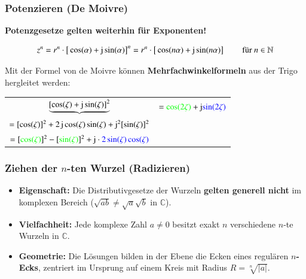 \subsubsection{Potenzieren (De Moivre)}

\textbf{Potenzgesetze gelten weiterhin für  Exponenten!}

\[z^n = r^n \cdot \big[ \cos(\alpha) + \mathop{} \! \mathrm{j} \sin(\alpha) \big]^n = r^n \cdot \big[ \cos(n \alpha) + \mathop{} \! \mathrm{j} \sin(n \alpha) \big] \qquad \text{ für } n \in \mathbb{N} \]

Mit der Formel von de Moivre können \textbf{Mehrfachwinkelformeln} aus der Trigo hergleitet
werden:\vspace{-1em}

\begin{center}
    \begin{tabular}{cl}
        $\underbrace{[\cos(\zeta) + \mathop{} \! \mathrm{j} \sin(\zeta)]^2} $                                                                        & $= {\color{green}\cos(2\zeta)} + \mathop{} \! \mathrm{j} {\color{blue}\sin(2\zeta)}$ \\
        $= [\cos(\zeta)]^2 + 2\mathop{} \! \mathrm{j} \cos(\zeta)\sin(\zeta) + \mathop{} \! \mathrm{j}^2 [\sin(\zeta)]^2$                                              &                                                                    \\
        $= [{\color{green}\cos(\zeta)}]^2 - [{\color{green}\sin(\zeta)}]^2 + \mathop{} \! \mathrm{j} \cdot {\color{blue}2 \sin(\zeta) \cos(\zeta)} $ &
    \end{tabular}
\end{center}

\subsubsection{Ziehen der $n$-ten Wurzel (Radizieren)}

\begin{itemize}
    \item \textbf{Eigenschaft:} Die Distributivgesetze der Wurzeln \textbf{gelten generell nicht} im komplexen Bereich ($\sqrt{ab} \neq \sqrt{a}\sqrt{b}$ in $\mathbb{C}$).
    \item \textbf{Vielfachheit:} Jede komplexe Zahl $a \neq 0$ besitzt exakt $n$ verschiedene $n$-te Wurzeln in $\mathbb{C}$.
    \item \textbf{Geometrie:} Die Lösungen bilden in der Ebene die Ecken eines regulären \textbf{$n$-Ecks}, zentriert im Ursprung auf einem Kreis mit Radius $R = \sqrt[n]{|a|}$.
\end{itemize}\vspace{-0.8em}

